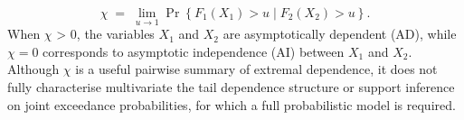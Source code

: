 \documentclass[12pt]{article}
\begin{document}
\[
  \chi \;=\; \lim_{u\to 1}\Pr\left\{F_1(X_1)>u \mid F_2(X_2)>u\right\}.
\]
When $\chi$ > 0, the variables $X_1$ and $X_2$ are asymptotically dependent (AD), while $\chi=0$ corresponds to asymptotic independence (AI) between $X_1$ and $X_2$.
Although \(\chi\) is a useful pairwise summary of extremal dependence, it does not fully characterise multivariate the tail dependence structure or support inference on joint exceedance probabilities, for which a full probabilistic model is required. 
\end{document}
